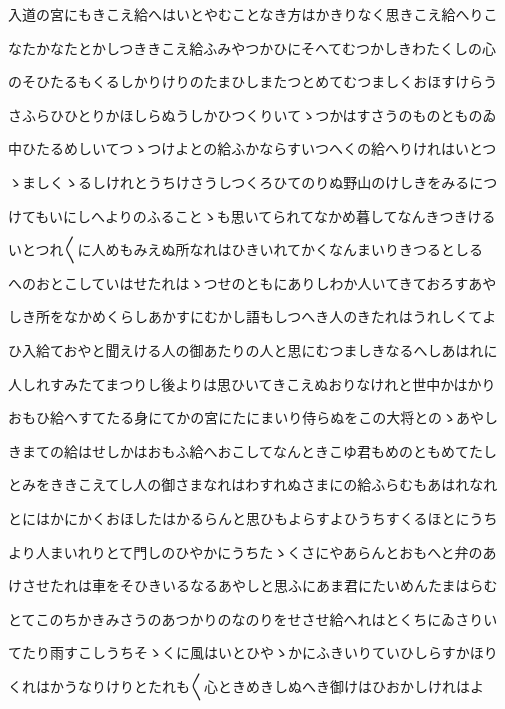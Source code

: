 \documentclass[a4paper,11pt,landscape]{ltjtarticle}
\begin{document}
入道の宮にもきこえ給へはいとやむことなき方はかきりなく思きこえ給へりこ
\par\medskip
なたかなたとかしつききこえ給ふみやつかひにそへてむつかしきわたくしの心
\par\medskip
のそひたるもくるしかりけりのたまひしまたつとめてむつましくおほすけらう
\par\medskip
さふらひひとりかほしらぬうしかひつくりいてゝつかはすさうのものとものゐ
\par\medskip
中ひたるめしいてつゝつけよとの給ふかならすいつへくの給へりけれはいとつ
\par\medskip
ゝましくゝるしけれとうちけさうしつくろひてのりぬ野山のけしきをみるにつ
\par\medskip
けてもいにしへよりのふることゝも思いてられてなかめ暮してなんきつきける
\par\medskip
いとつれ〱に人めもみえぬ所なれはひきいれてかくなんまいりきつるとしる
\par\medskip
へのおとこしていはせたれはゝつせのともにありしわか人いてきておろすあや
\par\medskip
しき所をなかめくらしあかすにむかし語もしつへき人のきたれはうれしくてよ
\par\medskip
ひ入給ておやと聞えける人の御あたりの人と思にむつましきなるへしあはれに
\par\medskip
人しれすみたてまつりし後よりは思ひいてきこえぬおりなけれと世中かはかり
\par\medskip
おもひ給へすてたる身にてかの宮にたにまいり侍らぬをこの大将とのゝあやし
\par\medskip
きまての給はせしかはおもふ給へおこしてなんときこゆ君もめのともめてたし
\par\medskip
とみをききこえてし人の御さまなれはわすれぬさまにの給ふらむもあはれなれ
\par\medskip
とにはかにかくおほしたはかるらんと思ひもよらすよひうちすくるほとにうち
\par\medskip
より人まいれりとて門しのひやかにうちたゝくさにやあらんとおもへと弁のあ
\par\medskip
けさせたれは車をそひきいるなるあやしと思ふにあま君にたいめんたまはらむ
\par\medskip
とてこのちかきみさうのあつかりのなのりをせさせ給へれはとくちにゐさりい
\par\medskip
てたり雨すこしうちそゝくに風はいとひやゝかにふきいりていひしらすかほり
\par\medskip
くれはかうなりけりとたれも〱心ときめきしぬへき御けはひおかしけれはよ
\par\medskip
\end{document}
